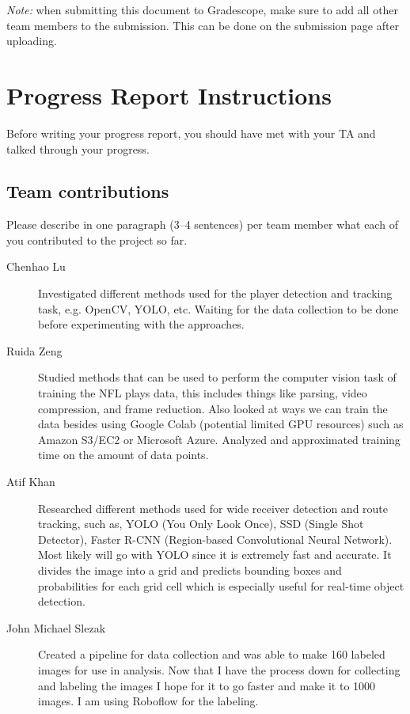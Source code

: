 \emph{Note:} when submitting this document to Gradescope, make sure to add all other team members to the submission. This can be done on the submission page after uploading.

\section*{Progress Report Instructions}

Before writing your progress report, you should have met with your TA and talked through your progress.

\subsection*{Team contributions}

Please describe in one paragraph (3--4 sentences) per team member what each of you contributed to the project so far.
\begin{description}
\item[Chenhao Lu] Investigated different methods used for the player detection and tracking task, e.g. OpenCV, YOLO, etc. Waiting for the data collection to be done before experimenting with the approaches.
\item[Ruida Zeng] Studied methods that can be used to perform the computer vision task of training the NFL plays data, this includes things like parsing, video compression, and frame reduction. Also looked at ways we can train the data besides using Google Colab (potential limited GPU resources) such as Amazon S3/EC2 or Microsoft Azure. Analyzed and approximated training time on the amount of data points.
\item[Atif Khan]  Researched different methods used for wide receiver detection and route tracking, such as, YOLO (You Only Look Once), SSD (Single Shot Detector), Faster R-CNN (Region-based Convolutional Neural Network). Most likely will go with YOLO since it is extremely fast and accurate. It divides the image into a grid and predicts bounding boxes and probabilities for each grid cell which is especially useful for real-time object detection.
\item [John Michael Slezak] Created a pipeline for data collection and was able to make 160 labeled images for use in analysis. Now that I have the process down for collecting and labeling the images I hope for it to go faster and make it to 1000 images. I am using Roboflow for the labeling.
\end{description}


